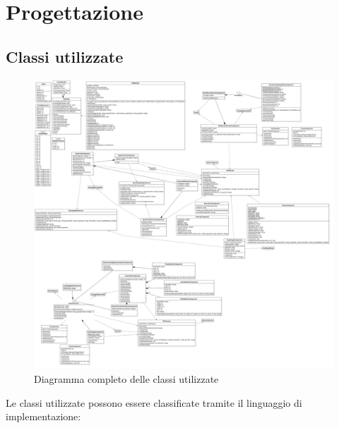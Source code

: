 \section{Progettazione}
\label{sec:progettazione}
\subsection{Classi utilizzate}
\begin{figure}[h]
    \centering
    \includegraphics[width=340pt]{images/prog/ENGaming.png}
    \caption{Diagramma completo delle classi utilizzate}
    \label{fig:diagrammaCompleto}
\end{figure}
Le classi utilizzate possono essere classificate tramite il linguaggio di implementazione:
